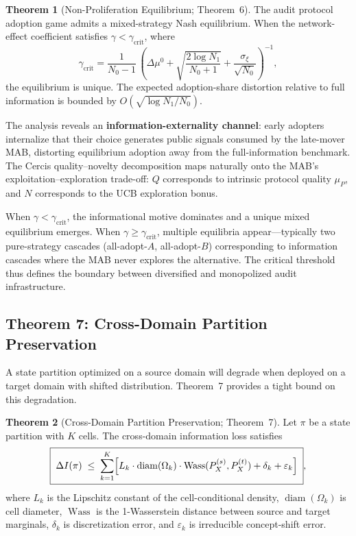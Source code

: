 \documentclass[twocolumn]{article}
\theoremstyle{definition}
\newtheorem{theorem}{Theorem}
\begin{document}
\begin{theorem}[Non-Proliferation Equilibrium; Theorem~6]
\label{thm:game}
The audit protocol adoption game admits a mixed-strategy Nash equilibrium. When the network-effect coefficient satisfies $\gamma < \gamma_{\text{crit}}$, where
\begin{equation}
\gamma_{\text{crit}} = \frac{1}{N_0-1}\,
\left(\Delta\mu^0 + \sqrt{\frac{2\log N_1}{N_0+1}} + \frac{\sigma_\xi}{\sqrt{N_0}}\right)^{-1},
\end{equation}
the equilibrium is unique. The expected adoption-share distortion relative to full information is bounded by $O(\sqrt{\log N_1/N_0})$.
\end{theorem}

The analysis reveals an \textbf{information-externality channel}: early adopters internalize that their choice generates public signals consumed by the late-mover MAB, distorting equilibrium adoption away from the full-information benchmark. The Cercis quality--novelty decomposition maps naturally onto the MAB's exploitation--exploration trade-off: $Q$ corresponds to intrinsic protocol quality $\mu_P$, and $N$ corresponds to the UCB exploration bonus.

When $\gamma < \gamma_{\text{crit}}$, the informational motive dominates and a unique mixed equilibrium emerges. When $\gamma \geq \gamma_{\text{crit}}$, multiple equilibria appear---typically two pure-strategy cascades (all-adopt-$A$, all-adopt-$B$) corresponding to information cascades where the MAB never explores the alternative. The critical threshold thus defines the boundary between diversified and monopolized audit infrastructure.

\subsection{Theorem 7: Cross-Domain Partition Preservation}

A state partition optimized on a source domain will degrade when deployed on a target domain with shifted distribution. Theorem~7 provides a tight bound on this degradation.

\begin{theorem}[Cross-Domain Partition Preservation; Theorem~7]
\label{thm:crossdomain}
Let $\pi$ be a state partition with $K$ cells. The cross-domain information loss satisfies
\begin{equation}
\boxed{\;
\Delta I(\pi) \;\leq\; \sum_{k=1}^{K}
\Bigl[L_k \cdot \operatorname{diam}(\Omega_k) \cdot \operatorname{Wass}(P^{(s)}_X, P^{(t)}_X)
+ \delta_k + \varepsilon_k\Bigr]
\;},
\end{equation}
where $L_k$ is the Lipschitz constant of the cell-conditional density, $\operatorname{diam}(\Omega_k)$ is cell diameter, $\operatorname{Wass}$ is the 1-Wasserstein distance between source and target marginals, $\delta_k$ is discretization error, and $\varepsilon_k$ is irreducible concept-shift error.
\end{theorem}
\end{document}

